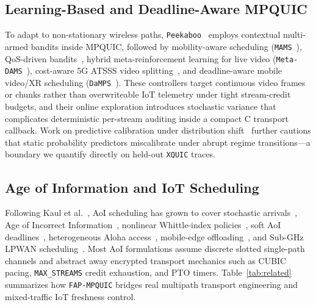 \documentclass[preprint,12pt,number]{elsarticle}
\begin{document}
\subsection{Learning-Based and Deadline-Aware MPQUIC}
To adapt to non-stationary wireless paths, \texttt{Peekaboo}~\cite{wu2020peekaboo} employs contextual multi-armed bandits inside MPQUIC, followed by mobility-aware scheduling (\texttt{MAMS}~\cite{yang2024mams}), QoS-driven bandits~\cite{yang2024qos}, hybrid meta-reinforcement learning for live video (\texttt{Meta-DAMS}~\cite{sepahi2024metadams}), cost-aware 5G ATSSS video splitting~\cite{amend2024cost}, and deadline-aware mobile video/XR scheduling (\texttt{DaMPS}~\cite{chen2024damps}). These controllers target continuous video frames or chunks rather than overwriteable IoT telemetry under tight stream-credit budgets, and their online exploration introduces stochastic variance that complicates deterministic per-stream auditing inside a compact C transport callback. Work on predictive calibration under distribution shift~\cite{guo2017calibration,ovadia2019uncertainty} further cautions that static probability predictors miscalibrate under abrupt regime transitions---a boundary we quantify directly on held-out \texttt{XQUIC} traces.

\subsection{Age of Information and IoT Scheduling}
Following Kaul et al.~\cite{kaul2012realtime}, AoI scheduling has grown to cover stochastic arrivals~\cite{yates2021age,kadota2021minimizing,kahraman2024survey}, Age of Incorrect Information~\cite{maatouk2020aoii}, nonlinear Whittle-index policies~\cite{tripathi2024whittle}, soft AoI deadlines~\cite{li2025soft}, heterogeneous Aloha access~\cite{wu2024paoi}, mobile-edge offloading~\cite{jiang2023aoi}, and Sub-GHz LPWAN scheduling~\cite{garridohidalgo2021lorawan,lima2021adaptive}. Most AoI formulations assume discrete slotted single-path channels and abstract away encrypted transport mechanics such as CUBIC pacing, \texttt{MAX\_STREAMS} credit exhaustion, and PTO timers. Table~\ref{tab:related} summarizes how \texttt{FAP-MPQUIC} bridges real multipath transport engineering and mixed-traffic IoT freshness control.
\end{document}
